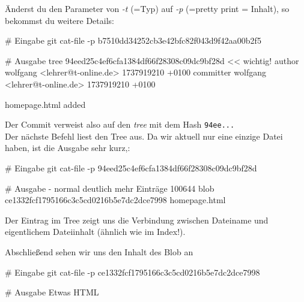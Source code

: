 \documentclass[
  ngerman,
  letterpaper,
  DIV=11]{scrreprt}
\newenvironment{Shaded}{\begin{snugshade}}{\end{snugshade}}
\newcommand{\AttributeTok}[1]{\textcolor[rgb]{0.40,0.45,0.13}{#1}}
\newcommand{\CommentTok}[1]{\textcolor[rgb]{0.37,0.37,0.37}{#1}}
\newcommand{\ExtensionTok}[1]{\textcolor[rgb]{0.00,0.23,0.31}{#1}}
\newcommand{\FunctionTok}[1]{\textcolor[rgb]{0.28,0.35,0.67}{#1}}
\newcommand{\NormalTok}[1]{\textcolor[rgb]{0.00,0.23,0.31}{#1}}
\newcommand{\OperatorTok}[1]{\textcolor[rgb]{0.37,0.37,0.37}{#1}}
\newcommand{\StringTok}[1]{\textcolor[rgb]{0.13,0.47,0.30}{#1}}
\begin{document}
Änderst du den Parameter von \emph{-t} (=Typ) auf \emph{-p} (=pretty
print = Inhalt), so bekommst du weitere Details:

\begin{Shaded}
\begin{Highlighting}[]
\CommentTok{\# Eingabe }
\FunctionTok{git}\NormalTok{ cat{-}file }\AttributeTok{{-}p}\NormalTok{ b7510dd34252cb3e42bfc82f043d9f42aa00b2f5}

\CommentTok{\# Ausgabe}
\ExtensionTok{tree}\NormalTok{ 94eed25c4ef6cfa1384df66f28308c09dc9bf28d   }\OperatorTok{\textless{}\textless{} wichtig!}
\StringTok{author wolfgang \textless{}lehrer@t{-}online.de\textgreater{} 1737919210 +0100}
\StringTok{committer wolfgang \textless{}lehrer@t{-}online.de\textgreater{} 1737919210 +0100}

\StringTok{homepage.html added}
\end{Highlighting}
\end{Shaded}

Der Commit verweist also auf den \emph{tree} mit dem Hash
\texttt{94ee...}\\
Der nächste Befehl liest den Tree aus. Da wir aktuell nur eine einzige
Datei haben, ist die Ausgabe sehr kurz,:

\begin{Shaded}
\begin{Highlighting}[]
\CommentTok{\# Eingabe}
\FunctionTok{git}\NormalTok{ cat{-}file }\AttributeTok{{-}p}\NormalTok{ 94eed25c4ef6cfa1384df66f28308c09dc9bf28d}

\CommentTok{\# Ausgabe {-} normal deutlich mehr Einträge}
\ExtensionTok{100644}\NormalTok{ blob ce1332fcf1795166c3c5cd0216b5e7dc2dce7998 homepage.html}
\end{Highlighting}
\end{Shaded}

Der Eintrag im Tree zeigt uns die Verbindung zwischen Dateiname und
eigentlichem Dateiinhalt (ähnlich wie im Index!).

Abschließend sehen wir uns den Inhalt des Blob an

\begin{Shaded}
\begin{Highlighting}[]
\CommentTok{\# Eingabe}
\FunctionTok{git}\NormalTok{ cat{-}file }\AttributeTok{{-}p}\NormalTok{ ce1332fcf1795166c3c5cd0216b5e7dc2dce7998}

\CommentTok{\# Ausgabe}
\ExtensionTok{Etwas}\NormalTok{ HTML}
\end{Highlighting}
\end{Shaded}
\end{document}
